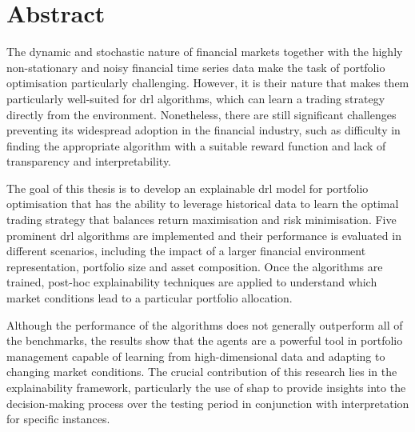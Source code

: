 \chapter*{Abstract}

The dynamic and stochastic nature of financial markets together with the highly non-stationary and noisy financial time series data make the task of portfolio optimisation particularly challenging. However, it is their nature that makes them particularly well-suited for \acrfull{drl} algorithms, which can learn a trading strategy directly from the environment. Nonetheless, there are still significant challenges preventing its widespread adoption in the financial industry, such as difficulty in finding the appropriate algorithm with a suitable reward function and lack of transparency and interpretability. 

The goal of this thesis is to develop an explainable \acrshort{drl} model for portfolio optimisation that has the ability to leverage historical data to learn the optimal trading strategy that balances return maximisation and risk minimisation. Five prominent \acrshort{drl} algorithms are implemented and their performance is evaluated in different scenarios, including the impact of a larger financial environment representation, portfolio size and asset composition. Once the algorithms are trained, post-hoc explainability techniques are applied to understand which market conditions lead to a particular portfolio allocation.

Although the performance of the algorithms does not generally outperform all of the benchmarks, the results show that the agents are a powerful tool in portfolio management capable of learning from high-dimensional data and adapting to changing market conditions. The crucial contribution of this research lies in the explainability framework, particularly the use of \acrfull{shap} to provide insights into the decision-making process over the testing period in conjunction with interpretation for specific instances.  
